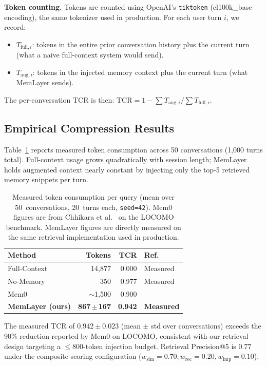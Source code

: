 \documentclass[10pt,twocolumn]{article}
\begin{document}
\textbf{Token counting.}
Tokens are counted using OpenAI's \texttt{tiktoken} (cl100k\_base encoding),
the same tokenizer used in production.  For each user turn $i$, we record:
\begin{itemize}
  \item $T_{\text{full},i}$: tokens in the entire prior conversation history
    plus the current turn (what a naive full-context system would send).
  \item $T_{\text{aug},i}$: tokens in the injected memory context plus the
    current turn (what MemLayer sends).
\end{itemize}
The per-conversation TCR is then:
$\text{TCR} = 1 - \sum T_{\text{aug},i} / \sum T_{\text{full},i}$.

\subsection{Empirical Compression Results}
\label{sec:compression}

\noindent
Table~\ref{tab:compression} reports measured token consumption across 50
conversations (1{,}000 turns total). Full-context usage grows quadratically
with session length; MemLayer holds augmented context nearly constant by
injecting only the top-5 retrieved memory snippets per turn.

\begin{table}[t]
\centering
\caption{Measured token consumption per query (mean over 50~conversations,
20~turns each, \texttt{seed=42}).
Mem0 figures are from Chhikara et al.~\citep{chhikara2025mem0} on the LOCOMO
benchmark. MemLayer figures are directly measured on the same retrieval
implementation used in production.}
\label{tab:compression}
\footnotesize
\setlength{\tabcolsep}{3pt}
\begin{tabular}{@{}lrrl@{}}
\toprule
Method & Tokens & TCR & Ref. \\
\midrule
Full-Context             & 14,877 & 0.000 & Measured \\
No-Memory                & 350    & 0.977 & Measured \\
Mem0                     & $\sim$1,500 & 0.900 & \citealt{chhikara2025mem0} \\
\textbf{MemLayer (ours)} & \textbf{867\,$\pm$\,167} & \textbf{0.942} & \textbf{Measured} \\
\bottomrule
\end{tabular}
\end{table}

The measured TCR of $0.942 \pm 0.023$ (mean $\pm$ std over conversations)
exceeds the 90\% reduction reported by Mem0 on LOCOMO, consistent with our
retrieval design targeting a $\leq$800-token injection budget.
Retrieval Precision@5 is $0.77$ under the composite scoring configuration
($w_{\text{sim}}{=}0.70, w_{\text{rec}}{=}0.20, w_{\text{imp}}{=}0.10$).
\end{document}
